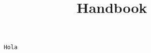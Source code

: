 \documentclass{article}
\title{Handbook}
\begin{document}
\begin{verbatim}
    Hola
\end{verbatim}
\end{document}
